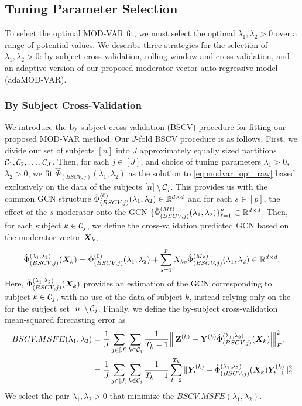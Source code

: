 

\subsection{Tuning Parameter Selection}

To select the optimal MOD-VAR fit, we must select the optimal $\lambda_1,\lambda_2>0$ over a range of potential values. We describe three strategies for the selection of $\lambda_1,\lambda_2>0$: by-subject cross validation, rolling window and cross validation, and an adaptive version of our proposed moderator vector auto-regressive model (adaMOD-VAR). 


\subsubsection{By Subject Cross-Validation}

We introduce the by-subject cross-validation (BSCV) procedure for fitting our proposed MOD-VAR method. Our $J$-fold BSCV procedure is as follows. First, we divide our set of subjects $[n]$ into $J$ approximately equally sized partitions $\mathcal{C}_1,\mathcal{C}_2,\ldots ,\mathcal{C}_J$. Then, for each $j\in[J]$, and choice of tuning parameters $\lambda_1 > 0$, $\lambda_2 > 0$, we fit $\hat\Phi_{(BSCV,j)}(\lambda_1,\lambda_2)$ as the solution to \eqref{eq:modvar_opt_raw} based exclusively on the data of the subjects $[n]\setminus\mathcal{C}_j$. This provides us with the common GCN structure $\hat\Phi_{(BSCV,j)}^{(0)}(\lambda_1,\lambda_2)\in\mathbb{R}^{d\times d}$ and for each $s\in[p]$, the effect of the $s$-moderator onto the GCN $\{\hat\Phi_{(BSCV,j)}^{(M\ell)}(\lambda_1,\lambda_2)\}_{\ell=1}^p\subset\mathbb{R}^{d\times d}$. Then, for each subject $k\in\mathcal{C}_j$, we define the cross-validation predicted GCN based on the moderator vector $\bm{X}_k$,
\begin{equation*}
	\hat\Phi_{(BSCV,j)}^{(\lambda_1,\lambda_2)}(\bm{X}_k) = \hat\Phi_{(BSCV,j)}^{(0)}(\lambda_1,\lambda_2) + \sum_{s = 1}^p X_{ks} \hat\Phi_{(BSCV,j)}^{(Ms)}(\lambda_1,\lambda_2)\in\mathbb{R}^{d\times d}.
\end{equation*}
Here, $\hat\Phi_{(BSCV,j)}^{(\lambda_1,\lambda_2)}(\bm{X}_k)$ provides an estimation of the GCN corresponding to subject $k\in\mathcal{C}_j$, with no use of the data of subject $k$, instead relying only on the for the subject set $[n]\setminus\mathcal{C}_j$. Finally, we define the by-subject cross-validation mean-squared forecasting error as
\begin{align*}
	BSCV.MSFE(\lambda_1,\lambda_2) &= \frac{1}{J}\sum_{j\in[J]} \sum_{k\in\mathcal{C}_j} \frac{1}{T_k-1}{\left\vert\kern-0.25ex\left\vert\kern-0.25ex\left\vert  \mathbf{Z}^{(k)}- \mathbf{Y}^{(k)} \hat\Phi_{(BSCV,j)}^{(\lambda_1,\lambda_2)}(\bm{X}_k)  \right\vert\kern-0.25ex\right\vert\kern-0.25ex\right\vert}_F^2.\\
	&= \frac{1}{J}\sum_{j\in[J]} \sum_{k\in\mathcal{C}_j} \frac{1}{T_k-1} \sum_{t=2}^{T_{k}} \| \bm{Y}^{(k)}_t - \hat\Phi_{(BSCV,j)}^{(\lambda_1,\lambda_2)}(\bm{X}_k)\bm{Y}^{(k)}_{t-1}  \|_2^2
\end{align*}
We select the pair $\lambda_1,\lambda_2> 0$ that minimize the $BSCV.MSFE(\lambda_1,\lambda_2)$.

